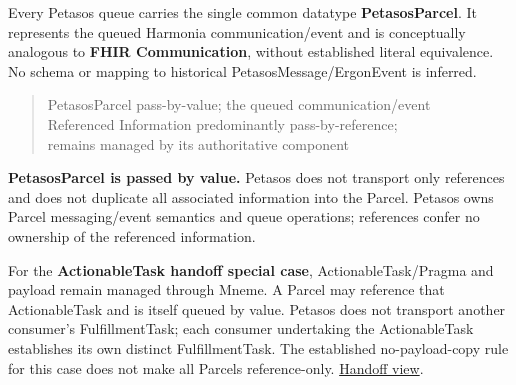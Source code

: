 Every Petasos queue carries the single common datatype \textbf{PetasosParcel}.
It represents the queued Harmonia communication/event and is conceptually
analogous to \textbf{FHIR Communication}, without established literal equivalence.
No schema or mapping to historical PetasosMessage/ErgonEvent is inferred.



\begin{quote}\small\ttfamily
PetasosParcel          pass-by-value; the queued communication/event\\
Referenced Information predominantly pass-by-reference;\\
                       remains managed by its authoritative component\\

\end{quote}


\textbf{PetasosParcel is passed by value.} Petasos does not transport only references
and does not duplicate all associated information into the Parcel. Petasos owns
Parcel messaging/event semantics and queue operations; references confer no
ownership of the referenced information.



For the \textbf{ActionableTask handoff special case}, ActionableTask/Pragma and payload
remain managed through Mneme. A Parcel may reference that ActionableTask and is
itself queued by value. Petasos does not transport another consumer's
FulfillmentTask; each consumer undertaking the ActionableTask establishes its own
distinct FulfillmentTask. The established no-payload-copy rule for this case
does not make all Parcels reference-only. \href{\detokenize{../../../../../docs/markdown/05-information-systems-architecture/pathways-journeys-and-handoff.md#persistent-handoff}}{Handoff view}.




